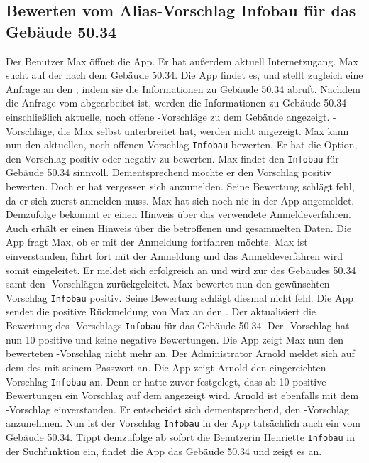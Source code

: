\subsection{Bewerten vom Alias-Vorschlag Infobau für das Gebäude 50.34}

Der Benutzer Max öffnet die App.
Er hat außerdem aktuell Internetzugang.
Max sucht auf der %
nach dem Gebäude 50.34.
Die App findet es, und stellt zugleich eine Anfrage an den %
, indem sie die Informationen zu Gebäude 50.34 abruft.
Nachdem die Anfrage vom %
abgearbeitet ist, werden die Informationen zu Gebäude 50.34 einschließlich aktuelle, noch offene %
-Vorschläge zu dem Gebäude angezeigt.
-Vorschläge, die Max selbst unterbreitet hat, werden nicht angezeigt.
Max kann nun den aktuellen, noch offenen Vorschlag \texttt{Infobau} bewerten.
Er hat die Option, den Vorschlag positiv oder negativ zu bewerten.
Max findet den %
\texttt{Infobau} für Gebäude 50.34 sinnvoll.
Dementsprechend möchte er den Vorschlag positiv bewerten.
Doch er hat vergessen sich anzumelden.
Seine Bewertung schlägt fehl, da er sich zuerst anmelden muss.
Max hat sich noch nie in der App angemeldet.
Demzufolge bekommt er einen Hinweis über das verwendete Anmeldeverfahren.
Auch erhält er einen Hinweis über die betroffenen und gesammelten Daten.
Die App fragt Max, ob er mit der Anmeldung fortfahren möchte.
Max ist einverstanden, fährt fort mit der Anmeldung und das Anmeldeverfahren wird somit eingeleitet.
Er meldet sich erfolgreich an und wird zur %
des Gebäudes 50.34 samt den %
-Vorschlägen zurückgeleitet.
Max bewertet nun den gewünschten %
-Vorschlag \texttt{Infobau} positiv.
Seine Bewertung schlägt diesmal nicht fehl.
Die App sendet die positive Rückmeldung von Max an den %
.
Der %
aktualisiert die Bewertung des %
-Vorschlags \texttt{Infobau} für das Gebäude 50.34.
Der %
-Vorschlag hat nun 10 positive und keine negative Bewertungen.
Die App zeigt Max nun den bewerteten %
-Vorschlag nicht mehr an.
Der Administrator Arnold meldet sich auf dem %
des %
mit seinem Passwort an.
Die App zeigt Arnold den eingereichten %
-Vorschlag \texttt{Infobau} an.
Denn er hatte zuvor festgelegt, dass ab 10 positive Bewertungen ein Vorschlag auf dem %
angezeigt wird.
Arnold ist ebenfalls mit dem %
-Vorschlag einverstanden.
Er entscheidet sich dementsprechend, den %
-Vorschlag anzunehmen.
Nun ist der Vorschlag \texttt{Infobau} in der App tatsächlich auch ein %
vom Gebäude 50.34.
Tippt demzufolge ab sofort die Benutzerin Henriette \texttt{Infobau} in der Suchfunktion ein, findet die App das Gebäude 50.34 und zeigt es an.